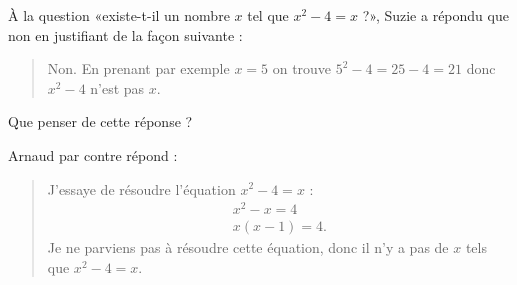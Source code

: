 
\begin{exercice}\label{exosmath-0562}

    À la question «existe-t-il un nombre \( x\) tel que \( x^2-4=x\) ?», Suzie a répondu que non en justifiant de la façon suivante : 
    \begin{quote}
        Non. En prenant par exemple \( x=5\) on trouve \( 5^2-4=25-4=21\) donc \( x^2-4\) n'est pas \( x\).
    \end{quote}
    Que penser de cette réponse ?

    Arnaud par contre répond :
    \begin{quote}
        J'essaye de résoudre l'équation \( x^2-4=x\) :
        \begin{subequations}
            \begin{align*}
                x^2-x=4\\
                x(x-1)=4.
            \end{align*}
        \end{subequations}
        Je ne parviens pas à résoudre cette équation, donc il n'y a pas de \( x\) tels que \( x^2-4=x\).
    \end{quote}

\end{exercice}
